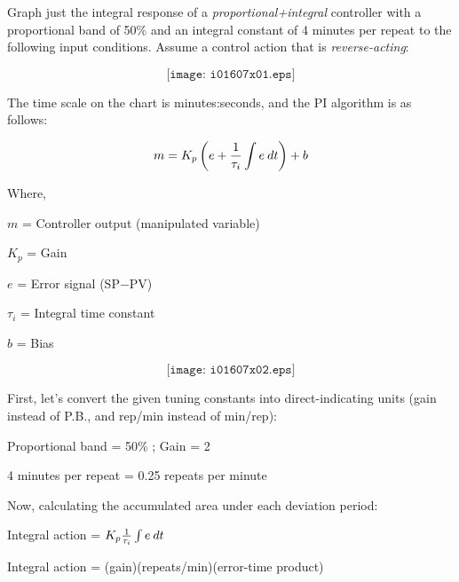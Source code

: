 

Graph just the integral response of a {\it proportional+integral} controller with a proportional band of 50\% and an integral constant of 4 minutes per repeat to the following input conditions.  Assume a control action that is {\it reverse-acting}:

$$\texttt{[image: i01607x01.eps]}$$

The time scale on the chart is minutes:seconds, and the PI algorithm is as follows:

$$m = K_p \left( e + {1 \over \tau_i} \int e \> dt \right) + b$$

\noindent
Where,

$m$ = Controller output (manipulated variable)

$K_p$ = Gain

$e$ = Error signal (SP$-$PV)

$\tau_i$ = Integral time constant

$b$ = Bias

\vskip 10pt







$$\texttt{[image: i01607x02.eps]}$$

First, let's convert the given tuning constants into direct-indicating units (gain instead of P.B., and rep/min instead of min/rep):
 
\vskip 10pt

Proportional band = 50\% ; Gain = 2
 
\vskip 10pt

4 minutes per repeat = 0.25 repeats per minute
 
\vskip 10pt
 
\noindent
Now, calculating the accumulated area under each deviation period:
 
\vskip 10pt
 
Integral action = $K_p {1\over \tau_i} \int e \> dt$
 
\vskip 10pt

Integral action = (gain)(repeats/min)(error-time product)
 
\vskip 10pt

